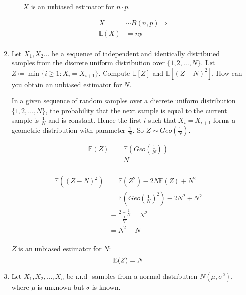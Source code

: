 \documentclass[10pt,\jkfside,a4paper]{article}
\begin{document}
\begin{enumerate}
\begin{enumerate}
$X$ is an unbiased estimator for $n \cdot p$.

\[
\begin{split}
X &\sim B(n, p) \Longrightarrow \\
\mathbb{E}(X) &= np \\
\end{split}
\]

\end{enumerate}

\setcounter{enumi}{4}

\item Let $X_1, X_2 \ldots$ be a sequence of independent and identically distributed samples from the discrete
uniform distribution over $\{1, 2,\dots, N\}$.
Let $Z \coloneqq \min\{i \geq 1: X_i = X_{i + 1}\}$.
Compute $\mathbb{E}[Z]$ and $\mathbb{E}\left[(Z - N)^2\right]$.
How can you obtain an unbiased estimator for $N$.


In a given sequence of random samples over a discrete uniform distribution $\{1, 2, \dots, N\}$, the
probability that the next sample is equal to the current sample is $\frac{1}{N}$ and is constant. Hence
the first $i$ such that $X_i = X_{i + 1}$ forms a geometric distribution with parameter $\frac{1}{N}$.
So $Z \sim Geo\left(\frac{1}{N}\right)$.

\[
\begin{split}
\mathbb{E}(Z) &= \mathbb{E}\left( Geo\left( \frac{1}{N} \right) \right) \\
&= N \\
\end{split}
\]

\[
\begin{split}
\mathbb{E}\left( (Z - N)^2 \right) &= \mathbb{E}\left( Z^2 \right) - 2N \mathbb{E}(Z) + N^2 \\
&= \mathbb{E}\left( Geo\left( \frac{1}{N} \right)^2 \right) - 2N^2 + N^2 \\
&= \frac{2 - \frac{1}{N}}{\frac{1}{N^2}} - N^2 \\
&= N^2 - N \\
\end{split}
\]

$Z$ is an unbiased estimator for $N$:
\[
\mathbb{E}(Z) = N \\
\]

\setcounter{enumi}{7}

\item Let $X_1, X_2, \ldots, X_n$ be i.i.d.\ samples from a normal distribution $N(\mu, \sigma^2)$, where
$\mu$ is unknown but $\sigma$ is known. 


\end{enumerate}
\end{document}
